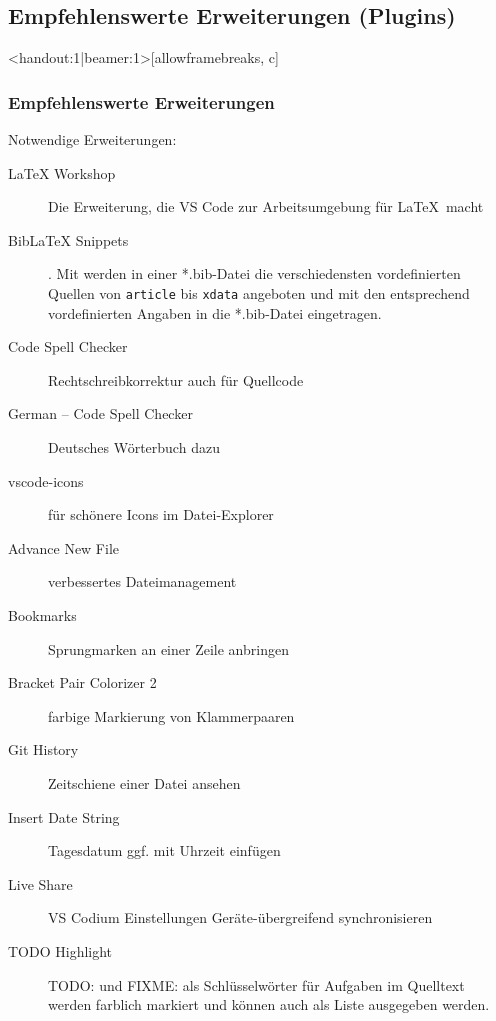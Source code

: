 \documentclass[t, %
							xcolor=dvipsnames,%
							hyperref={bookmarks,colorlinks},%
							]%
							{beamer}
\begin{document}
		\subsection{Empfehlenswerte Erweiterungen (Plugins)}
		\label{sub:EmpfehlenswerteErweiterungen}
		\begin{frame}<handout:1|beamer:1>[allowframebreaks, c]
			\frametitle{Empfehlenswerte Erweiterungen}
			Notwendige Erweiterungen:
			\begin{description}
				\item[LaTeX Workshop] Die Erweiterung, die VS Code zur Arbeitsumgebung für \LaTeX\ macht
				\item[BibLaTeX Snippets]. Mit  werden in einer *.bib-Datei die verschiedensten vordefinierten Quellen von  \texttt{article} bis \texttt{xdata} angeboten und mit den entsprechend vordefinierten Angaben in die *.bib-Datei eingetragen. 
				\item[Code Spell Checker] Rechtschreibkorrektur auch für Quellcode
				\item[German – Code Spell Checker]Deutsches Wörterbuch dazu
				\item[vscode-icons] für schönere Icons im Datei-Explorer
				\framebreak 
				\item[Advance New File] verbessertes Dateimanagement
				\item[Bookmarks] Sprungmarken an einer Zeile anbringen
				\item[Bracket Pair Colorizer 2] farbige Markierung von Klammerpaaren
				\item[Git History] Zeitschiene einer Datei ansehen
				\item[Insert Date String] Tagesdatum ggf. mit Uhrzeit einfügen
				\item[Live Share] VS Codium Einstellungen Geräte-übergreifend synchronisieren
				\item[TODO Highlight] TODO: und FIXME: als Schlüsselwörter für Aufgaben im Quelltext werden farblich markiert und können auch als Liste ausgegeben werden.
			\end{description}
		\end{frame}
\end{document}

